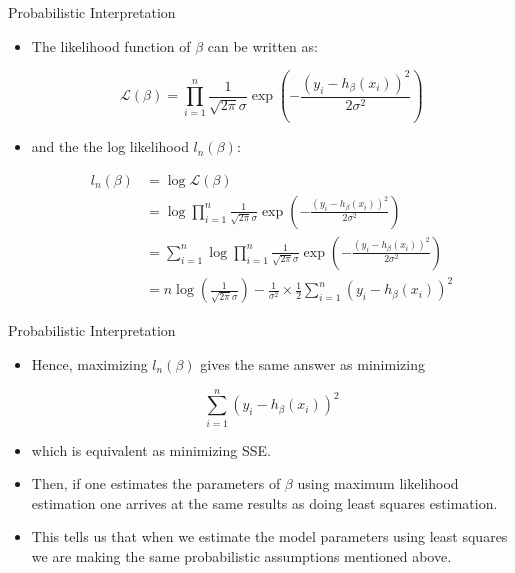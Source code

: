 \documentclass[handout]{beamer}
\begin{document}
\begin{frame}{Probabilistic Interpretation}
\scriptsize{
\begin{itemize}



 \item The likelihood function of $\beta$ can be written as:
 
 \begin{displaymath}
  \mathcal{L}(\beta) = \prod_{i=1}^{n}\frac{1}{\sqrt{2\pi} \sigma} \exp \left(- \frac{(y_i - h_{\beta}(x_{i}) )^{2}}{2\sigma^2}\right)
 \end{displaymath}

 \item and the the log likelihood $l_n(\beta)$:
 
   \begin{align}
l_n(\beta)  & =  \log  \mathcal{L}(\beta) \\
 & = \log \prod_{i=1}^{n}\frac{1}{\sqrt{2\pi} \sigma} \exp \left(- \frac{(y_i - h_{\beta}(x_{i}) )^{2}}{2\sigma^2}\right) \\
  & = \sum_{i=1}^n  \log \prod_{i=1}^{n}\frac{1}{\sqrt{2\pi} \sigma} \exp \left(- \frac{(y_i - h_{\beta}(x_{i}) )^{2}}{2\sigma^2}\right) \\
    & = n \log\left(\frac{1}{\sqrt{2\pi} \sigma}\right) - \frac{1}{\sigma^2}\times \frac{1}{2}\sum_{i=1}^n(y_i - h_{\beta}(x_{i}) )^{2}  
 \end{align}
 

\end{itemize}


}
 
\end{frame}


\begin{frame}{Probabilistic Interpretation}
\scriptsize{
\begin{itemize}



 \item Hence, maximizing $l_n(\beta)$ gives the same answer as minimizing
 
 \begin{displaymath}
\sum_{i=1}^n(y_i - h_{\beta}(x_{i}))^{2}
 \end{displaymath}

 \item which is equivalent as minimizing SSE.
 
 \item  Then, if one estimates the parameters of $\beta$ using maximum likelihood estimation one arrives at the same results as doing least squares estimation.
 \item This tells us that when we estimate the model parameters using least squares we are making the same probabilistic assumptions mentioned above.

\end{itemize}


}
 
\end{frame}
\end{document}
